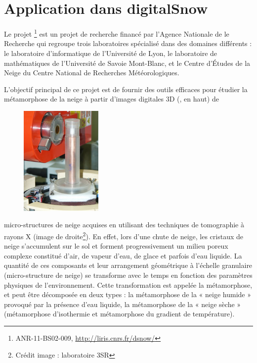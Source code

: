%
\section{Application dans digitalSnow}%
\label{sec:applications:digitalsnow}
%
Le projet \digitalSnow\footnote{ANR-11-BS02-009, \url{http://liris.cnrs.fr/dsnow/}} est un projet de recherche financé par l'Agence Nationale de le
Recherche qui regroupe trois laboratoires spécialisé dans des domaines
différents : le laboratoire d'informatique \textsc{} de l'Université de
Lyon, le laboratoire de mathématiques \textsc{} de l'Université de Savoie
Mont-Blanc, et le Centre d'Études de la Neige \textsc{} du Centre National de
Recherches Météorologiques.


L'objectif principal de ce projet est de fournir des outils efficaces pour
étudier la métamorphose de la neige à partir d'images digitales 3D
(, en haut) de
%
\begin{figure}
	\includegraphics[width=4cm]{images/digitalSnow/YTEjpE}
\end{figure}
%
micro-structures de neige acquises en utilisant des techniques de tomographie à
rayons X (image de droite\footnote{Crédit image : laboratoire 3SR}). En effet,
lors d'une chute de neige, les cristaux de neige s'accumulent sur le sol et
forment progressivement un milieu poreux complexe constitué d'air, de vapeur
d'eau, de glace et parfois d'eau liquide. La quantité de ces composants et leur
arrangement géométrique à l'échelle granulaire (micro-structure de neige) se
transforme avec le temps en fonction des paramètres physiques de
l'environnement. Cette transformation est appelée la métamorphose, et peut être
décomposée en deux types : la métamorphose de la « neige humide » provoqué par
la présence d'eau liquide, la métamorphose de la « neige sèche » (métamorphose
d'isothermie et métamorphose du gradient de température).


